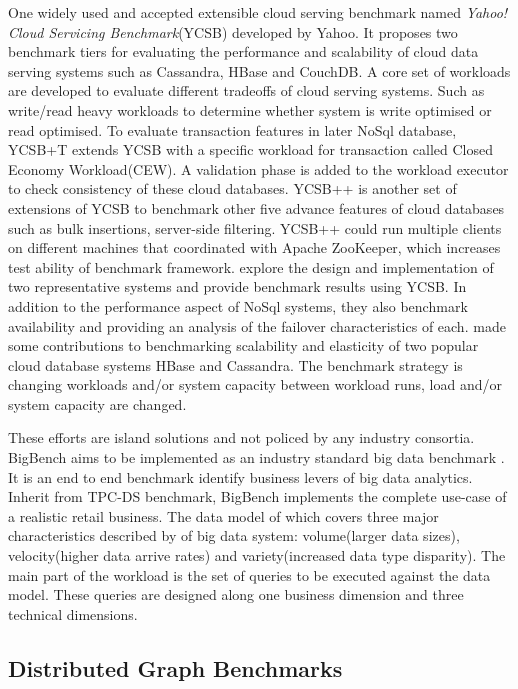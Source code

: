 One widely used and accepted extensible cloud serving benchmark named \textit{Yahoo! Cloud Servicing Benchmark}(YCSB) developed by Yahoo. \cite{YCSB} It  proposes two benchmark tiers for evaluating the performance and scalability of cloud data serving systems such as Cassandra, HBase and CouchDB. A core set of workloads are developed to evaluate different tradeoffs of cloud serving systems. Such as write/read heavy workloads to determine whether system is write optimised or read optimised. To evaluate transaction features in later NoSql database,  YCSB+T \cite{dey2014ycsb+t} extends YCSB with a specific workload for transaction called Closed Economy Workload(CEW). A validation phase is added to the workload executor to check consistency of these cloud databases. YCSB++ \cite{ycsb++} is another set of extensions of YCSB to benchmark other five advance features of cloud databases such as bulk insertions, server-side filtering. YCSB++ could run multiple clients on different machines that coordinated with Apache ZooKeeper, which increases test ability of benchmark framework. \citet{pokludabenchmarking}  explore the design and implementation of two representative systems and provide benchmark results using YCSB. In addition to the performance aspect of NoSql systems, they also benchmark availability and providing an analysis of the failover characteristics of each. \citet{Kuhlenkamp} made some contributions to benchmarking scalability and elasticity of two popular cloud database systems HBase and Cassandra. The benchmark strategy is changing workloads and/or system capacity between workload runs, load and/or system capacity are changed.

These efforts are island solutions and not policed by any industry consortia. BigBench aims to be implemented as an industry standard big data benchmark \cite{BigBench}. It is an end to end benchmark identify business levers of big data analytics. Inherit from TPC-DS benchmark, BigBench implements the complete use-case of a realistic retail business. The data model of which covers three major characteristics described by \citet{laney20013d} of big data system: volume(larger data sizes), velocity(higher data arrive rates) and variety(increased data type disparity). The main part of the workload is the set of queries to be executed against the data model. These queries are designed along one business dimension and three technical dimensions. \cite{BigBench}

\subsection{ Distributed Graph Benchmarks}

